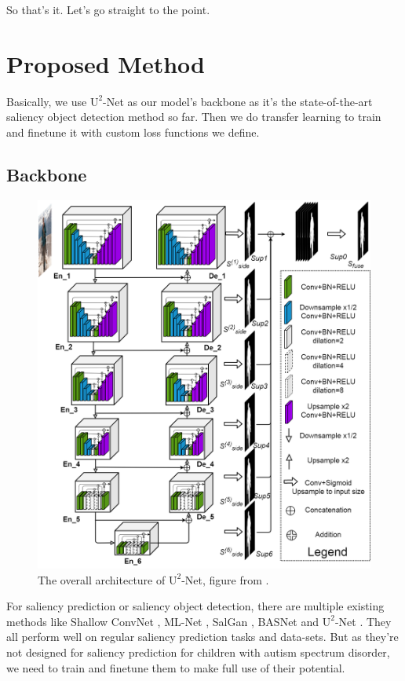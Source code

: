 \documentclass[journal]{IEEEtran}
\begin{document}
So that's it. Let's go straight to the point.

\section{Proposed Method}

Basically, we use $\text{U}^2$-Net \cite{Qin_2020_PR} as our model's backbone as it's the state-of-the-art saliency object detection method so far. Then we do transfer learning \cite{pan2009survey} to train and finetune it with custom loss functions we define.

\subsection{Backbone}

\begin{figure}
    \centering
    \includegraphics[height=.5\textheight]{u-2-net-architecture.png}
    \caption{The overall architecture of $\text{U}^2$-Net, figure from \cite{Qin_2020_PR}.}
    \label{fig:u-2-net-architecture}
\end{figure}

For saliency prediction or saliency object detection, there are multiple existing methods like Shallow ConvNet \cite{Pan_2016_CVPR}, ML-Net \cite{mlnet2016}, SalGan \cite{Pan_2017_SalGAN}, BASNet \cite{Qin_2019_CVPR} and $\text{U}^2$-Net \cite{Qin_2020_PR}. They all perform well on regular saliency prediction tasks and data-sets. But as they're not designed for saliency prediction for children with autism spectrum disorder, we need to train and finetune them to make full use of their potential.
\end{document}
